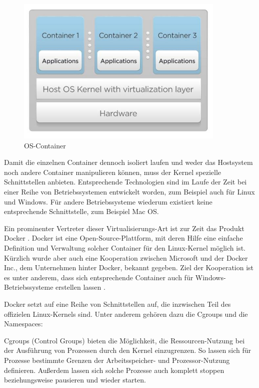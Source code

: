 \begin{figure}[!ht]
  \begin{center}
    \includegraphics[width=10cm]{bilder/lxc-architecture.jpg}
    \caption{OS-Container \citep{Francis2014}}
  \end{center}
\end{figure}

Damit die einzelnen Container dennoch isoliert laufen und weder das Hostsystem noch andere Container manipulieren können, muss der Kernel spezielle Schnittstellen anbieten. Entsprechende Technologien sind im Laufe der Zeit bei einer Reihe von Betriebssystemen entwickelt worden, zum Beispiel auch für Linux und Windows. Für andere Betriebssysteme wiederum existiert keine entsprechende Schnittstelle, zum Beispiel Mac OS.

Ein prominenter Vertreter dieser Virtualisierungs-Art ist zur Zeit das Produkt Docker \citep[Vgl.][]{docker:002}. Docker ist eine Open-Source-Plattform, mit deren Hilfe eine einfache Definition und Verwaltung solcher Container für den Linux-Kernel möglich ist. Kürzlich wurde aber auch eine Kooperation zwischen Microsoft und der Docker Inc., dem Unternehmen hinter Docker, bekannt gegeben. Ziel der Kooperation ist es unter anderem, dass sich entsprechende Container auch für Windows-Betriebssysteme erstellen lassen \citep[Vgl.][]{heise:001}.

Docker setzt auf eine Reihe von Schnittstellen auf, die inzwischen Teil des offizielen Linux-Kernels sind. Unter anderem gehören dazu die Cgroups und die Namespaces:

Cgroups (Control Groups) \citep[Vgl.][S. 3]{Schee14} bieten die Möglichkeit, die Ressourcen-Nutzung bei der Ausführung von Prozessen durch den Kernel einzugrenzen. So lassen sich für Prozesse bestimmte Grenzen der Arbeitsspeicher- und Prozessor-Nutzung definieren. Außerdem lassen sich solche Prozesse auch komplett stoppen beziehungsweise pausieren und wieder starten.

